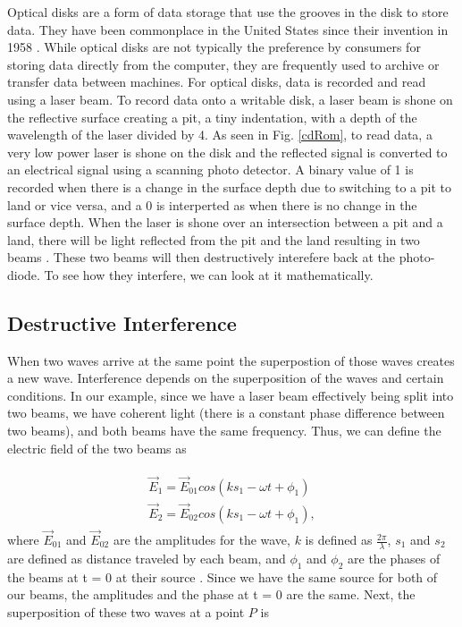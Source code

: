 \documentclass[ notitlepage, numerical, 11pt]{revtex4-1} %
\begin{document}
Optical disks are a form of data storage that use the grooves in the disk to store data. They have been commonplace in the United States since their invention in 1958 \cite{memory}. While optical disks are not typically the preference by consumers for storing data directly from the computer, they are frequently used to archive or transfer data between machines. For optical disks, data is recorded and read using a laser beam. To record data onto a writable disk, a laser beam is shone on the reflective surface creating a pit, a tiny indentation, with a depth of the wavelength of the laser divided by 4. As seen in Fig. \ref{cdRom}, to read data, a very low power laser is shone on the disk and the reflected signal is converted to an electrical signal using a scanning photo detector. A binary value of 1 is recorded when there is a change in the surface depth due to switching to a pit to land or vice versa, and a 0 is interperted as when there is no change in the surface depth. When the laser is shone over an intersection between a pit and a land, there will be light reflected from the pit and the land resulting in two beams \cite{memory}. These two beams will then destructively interefere back at the photo-diode. To see how they interfere, we can look at it mathematically. 


\subsection{Destructive Interference}
When two waves arrive at the same point the superpostion of those waves creates a new wave. Interference depends on the superposition of the waves and certain conditions. In our example, since we have a laser beam effectively being split into two beams, we have coherent light (there is a constant phase difference between two beams), and both beams have the same frequency. Thus, we can define the electric field of the two beams as


\begin{align}
\begin{split}
\vec{E}_{1} = \vec{E}_{01} cos(k s_1-\omega t + \phi_1) \\
\vec{E}_{2} = \vec{E}_{02} cos(k s_1-\omega t + \phi_1),
\end{split}
\label{eRefInf}
\end{align}
where $ \vec{E}_{01}$ and $ \vec{E}_{02}$ are the amplitudes for the wave, $k$ is defined as $\frac{2\pi}{\lambda}$, $s_1$ and $s_2$ are defined as distance traveled by each beam, and $\phi_1$ and $\phi_2$ are the phases of the beams at t = 0 at their source \cite{optics}. Since we have the same source for both of our beams, the amplitudes and the phase at t = 0 are the same. Next, the superposition of these two waves at a point $P$ is 
\end{document}
